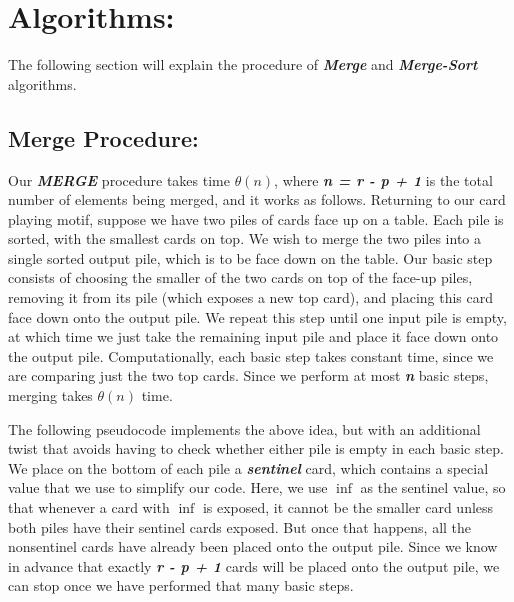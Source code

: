 \section{Algorithms:}

The following section will explain the procedure of {\bfseries\itshape Merge} and {\bfseries\itshape Merge-Sort} algorithms.

\subsection{Merge Procedure:}

Our {\bfseries\itshape MERGE} procedure takes time $\theta ( n )$, where {\bfseries\itshape n = r - p + 1} is the total number of elements being merged, and it works as follows. Returning to our card playing motif, suppose we have two piles of cards face up on a table. Each pile is sorted, with the smallest cards on top. We wish to merge the two piles into a single sorted output pile, which is to be face down on the table. Our basic step consists of choosing the smaller of the two cards on top of the face-up piles, removing it from its pile (which exposes a new top card), and placing this card face down onto the output pile. We repeat this step until one input pile is empty, at which time we just take the remaining input pile and place it face down onto the output pile. Computationally, each basic step takes constant time, since we are comparing just the two top cards. Since we perform at most {\bfseries\itshape n} basic steps, merging takes $\theta ( n )$ time. \hfill \break

The following pseudocode implements the above idea, but with an additional twist that avoids having to check whether either pile is empty in each basic step. We place on the bottom of each pile a {\bfseries\itshape sentinel} card, which contains a special value that we use to simplify our code. Here, we use $\inf$ as the sentinel value, so that whenever a card with $\inf$ is exposed, it cannot be the smaller card unless both piles have their sentinel cards exposed. But once that happens, all the nonsentinel cards have already been placed onto the output pile. Since we know in advance that exactly {\bfseries\itshape r - p + 1} cards will be placed onto the output pile, we can stop once we have performed that many basic steps. \hfill \break

